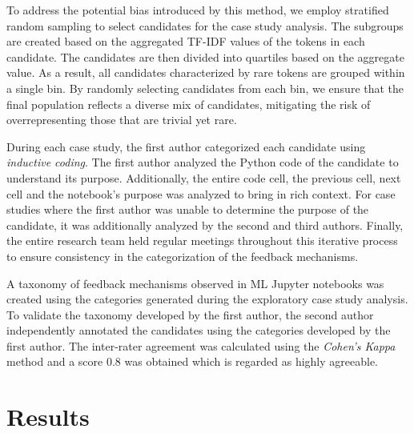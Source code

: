 \documentclass[smallextended]{svjour3}       %
\begin{document}
To address the potential bias introduced by this method, we employ stratified random sampling to select candidates for the case study analysis. The subgroups are created based on the aggregated TF-IDF values of the tokens in each candidate. The candidates are then divided into quartiles based on the aggregate value. As a result, all candidates characterized by rare tokens are grouped within a single bin. By randomly selecting candidates from each bin, we ensure that the final population reflects a diverse mix of candidates, mitigating the risk of overrepresenting those that are trivial yet rare.


During each case study, the first author categorized each candidate using \emph{inductive coding}. The first author analyzed the Python code of the candidate to understand its purpose. Additionally, the entire code cell, the previous cell, next cell and the notebook's purpose was analyzed to bring in rich context. For case studies where the first author was unable to determine the purpose of the candidate, it was additionally analyzed by the second and third authors. Finally, the entire research team held regular meetings throughout this iterative process to ensure consistency in the categorization of the feedback mechanisms.

A taxonomy of feedback mechanisms observed in ML Jupyter notebooks was created using the categories generated during the exploratory case study analysis. To validate the taxonomy developed by the first author, the second author independently annotated the candidates using the categories developed by the first author. The inter-rater agreement was calculated using the \emph{Cohen's Kappa} method and a score 0.8 was obtained which is regarded as highly agreeable.

\section{Results}
\end{document}
